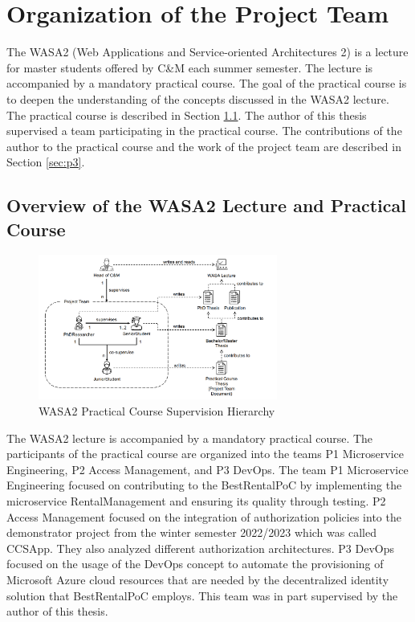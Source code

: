 \chapter{Organization of the Project Team}
\label{cha:projektteam-arbeiten}

The WASA2 (Web Applications and Service-oriented Architectures 2) is a lecture for master students
offered by C\&M each summer semester. The lecture is accompanied by a mandatory practical course.
The goal of the practical course is to deepen the understanding of the concepts discussed in the WASA2
lecture. The practical course is described in Section \ref{sec:wasa2_overview}.
The author of this thesis supervised a team participating in the practical course.
The contributions of the author to the practical course and the work of the project team are described in Section \ref{sec:p3}.

\section{Overview of the WASA2 Lecture and Practical Course}
\label{sec:wasa2_overview}

\begin{figure}[tb]
	\centering
	\includegraphics[width=0.7\textwidth]{figures/7.1_practical_course_roles.png}
	\caption{WASA2 Practical Course Supervision Hierarchy \cite{CM-W-INT}}
	\label{fig:practical_course_roles}
\end{figure}

The WASA2 lecture is accompanied by a mandatory practical course.
The participants of the practical course are organized into the teams P1 Microservice Engineering,
P2 Access Management, and P3 DevOps. The team P1 Microservice Engineering focused on contributing
to the BestRentalPoC by implementing the microservice RentalManagement and ensuring its
quality through testing.
P2 Access Management focused on the integration of authorization policies into the demonstrator
project from the winter semester 2022/2023 which was called CCSApp. They also analyzed
different authorization architectures.
P3 DevOps focused on the usage of the DevOps concept to automate the provisioning
of Microsoft Azure cloud resources that are needed by the decentralized identity solution
that BestRentalPoC employs. This team was in part supervised by the author of this thesis.


